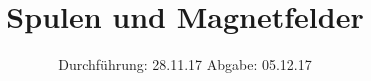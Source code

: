 

\subject{V308}
\title{Spulen und Magnetfelder}
\date{
  Durchführung: 28.11.17
  \hspace{3em}
  Abgabe: 05.12.17
}



\maketitle
\thispagestyle{empty}
\tableofcontents
\newpage








\newpage
\printbibliography


